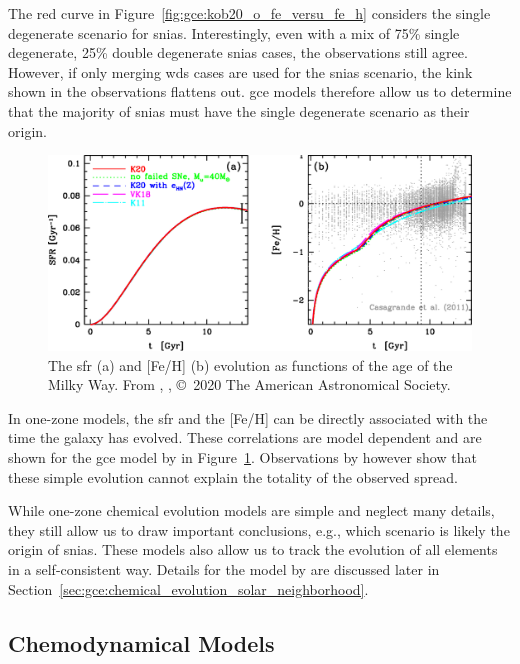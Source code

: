 The red curve in Figure~\ref{fig:gce:kob20_o_fe_versu_fe_h} considers the single degenerate scenario for \acp{snia}. Interestingly, even with a mix of 75\% single degenerate, 25\% double degenerate \acp{snia} cases, the observations still agree. However, if only merging \acp{wd} cases are used for the \acp{snia} scenario, the kink shown in the observations flattens out. \ac{gce} models therefore allow us to determine that the majority of \acp{snia} must have the single degenerate scenario as their origin.

\begin{figure}[tb]
    \centering
    \includegraphics[width=\textwidth]{graphics/gce/kobayashi20_fig1ab}
    \caption{The \ac{sfr} (a) and [Fe/H] (b) evolution as functions of the age of the Milky Way. From \citet{kobayashi20}, , \copyright\ 2020 The American Astronomical Society.}
    \label{fig:gce:kob20_sfr_and_fe_h_versus_time}
\end{figure}
In one-zone models, the \ac{sfr} and the [Fe/H] can be directly associated with the time the galaxy has evolved. These correlations are model dependent and are shown for the \ac{gce} model by \citet{kobayashi20} in Figure~\ref{fig:gce:kob20_sfr_and_fe_h_versus_time}. Observations by \citet{casagrande11} however show that these simple evolution cannot explain the totality of the observed spread. 

While one-zone chemical evolution models are simple and neglect many details, they still allow us to draw important conclusions, e.g., which scenario is likely the origin of \acp{snia}. These models also allow us to track the evolution of all elements in a self-consistent way. Details for the model by \citet{kobayashi20} are discussed later in Section~\ref{sec:gce:chemical_evolution_solar_neighborhood}.


\subsection{Chemodynamical Models}

